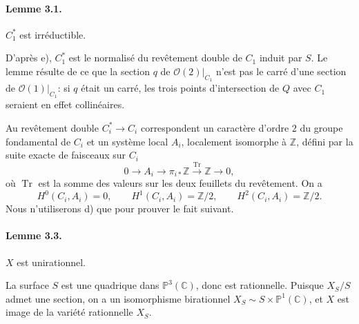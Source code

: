 \documentclass[10pt]{article}
\newcommand{\C}{\mathbb C}
\newcommand{\Pj}{\mathbb P}
\newcommand{\Z}{\mathbb Z}
\newcommand{\Tr}{\operatorname{Tr}}
\begin{document}
\paragraph{Lemme 3.1.} \(C_1^*\) est irréductible.

D'après e), \(C_1^*\) est le normalisé du revêtement double de \(C_1\) induit par \(S\). Le lemme résulte de ce que la section \(q\) de \(\mathcal O(2)|_{C_1}\) n'est pas le carré d'une section de \(\mathcal O(1)|_{C_1}\): si \(q\) était un carré, les trois points d'intersection de \(Q\) avec \(C_1\) seraient en effet collinéaires.

Au revêtement double \(C_i^*\to C_i\) correspondent un caractère d'ordre \(2\) du groupe fondamental de \(C_i\) et un système local \(A_i\), localement isomorphe à \(\Z\), défini par la suite exacte de faisceaux sur \(C_i\)
\[
0\longrightarrow A_i\longrightarrow \pi_{i*}\Z \xrightarrow{\Tr}\Z\longrightarrow0,
\]
où \(\Tr\) est la somme des valeurs sur les deux feuillets du revêtement. On a
\[
\tag{3.2}
H^0(C_i,A_i)=0,
\qquad H^1(C_i,A_i)=\Z/2,
\qquad H^2(C_i,A_i)=\Z/2.
\]
Nous n'utiliserons d) que pour prouver le fait suivant.

\paragraph{Lemme 3.3.} \(X\) est unirationnel.

La surface \(S\) est une quadrique dans \(\Pj^3(\C)\), donc est rationnelle. Puisque \(X_S/S\) admet une section, on a un isomorphisme birationnel \(X_S\sim S\times\Pj^1(\C)\), et \(X\) est image de la variété rationnelle \(X_S\).
\end{document}
